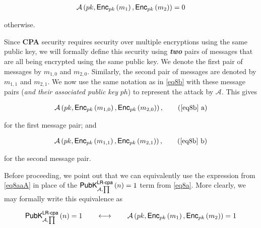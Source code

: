 \documentclass[../CryptoHW3.tex]{subfiles}
\begin{document}
\begin{flushleft}
\begin{align}
  \mathcal{A} \left( pk,  \text{{\fontfamily{phv}\selectfont Enc}}_{pk} \left( m_1 \right), \text{{\fontfamily{phv}\selectfont Enc}}_{pk} \left( m_2 \right) \right) = 0 \label{eq8aaB}
\end{align}

otherwise. \newline


Since \textbf{CPA} security requires security over multiple encryptions using the same public key, we will formally define this security using \textbf{\emph{two}} pairs of messages that are all being encrypted using the same public key.  We denote the first pair of messages by $m_{1, 0}$ and $m_{2, 0}$.  Similarly, the second pair of messages are denoted by  $m_{1, 1}$ and $m_{2, 1}$.  We now use the same notation as in \ref{eq8b} with these message pairs (\emph{and their associated public key} $ph$) to represent the attack by $\mathcal{A}$.  This gives

\begin{align}
  \mathcal{A} \left( pk,  \text{{\fontfamily{phv}\selectfont Enc}}_{pk} \left( m_{1, 0} \right), \text{{\fontfamily{phv}\selectfont Enc}}_{pk} \left( m_{2, 0} \right) \right), \tag{\ref{eq8b} a} \label{eq8b1}
\end{align}

for the first message pair; and 

\begin{align}
  \mathcal{A} \left( pk,  \text{{\fontfamily{phv}\selectfont Enc}}_{pk} \left( m_{1, 1} \right), \text{{\fontfamily{phv}\selectfont Enc}}_{pk} \left( m_{2, 1} \right) \right), \tag{\ref{eq8b} b} \label{eq8b2}
\end{align}
\setcounter{equation}{2}

for the second message pair. \newline


Before proceeding, we point out that we can equivalently use the expression from \ref{eq8aaA} in place of the $\text{{\fontfamily{phv}\selectfont PubK}}^{\text{{\fontfamily{phv}\selectfont LR-cpa}}}_{\mathcal{A}, \prod} \left( n \right) = 1$ term from \ref{eq8a}.  More clearly, we may formally write this equivalence as

\begin{align*}
  \text{{\fontfamily{phv}\selectfont PubK}}^{\text{{\fontfamily{phv}\selectfont LR-cpa}}}_{\mathcal{A}, \prod} \left( n \right) = 1  \qquad  \longleftrightarrow \qquad \mathcal{A} \left( pk,  \text{{\fontfamily{phv}\selectfont Enc}}_{pk} \left( m_1 \right), \text{{\fontfamily{phv}\selectfont Enc}}_{pk} \left( m_2 \right) \right) = 1
\end{align*}


\end{flushleft}
\end{document}
